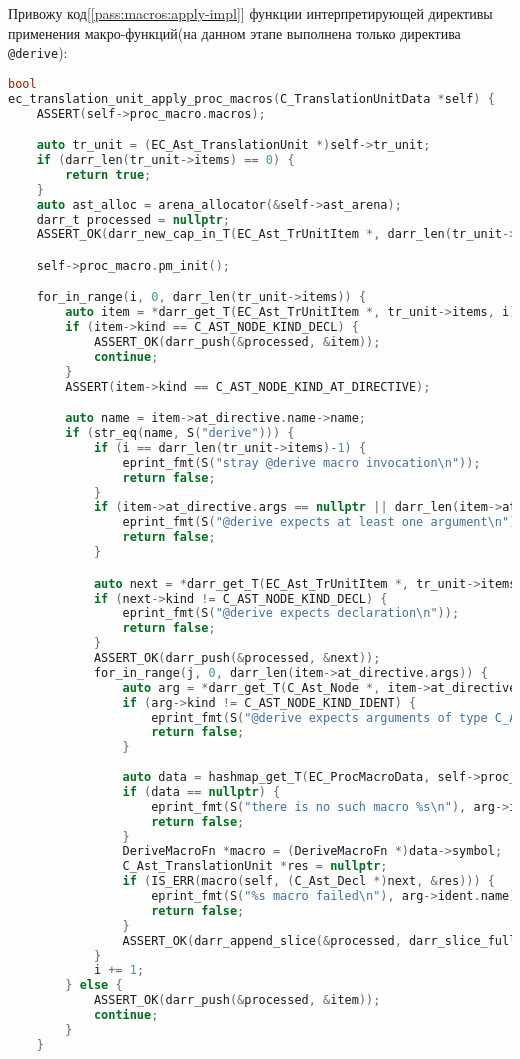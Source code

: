 Привожу код[\ref{pass:macros:apply-impl}] функции интерпретирующей директивы применения макро-функций(на данном этапе выполнена только директива \verb|@derive|):
\begin{lstlisting}[language=c, caption={Реализация функции применения макросов}, label={pass:macros:apply-impl}]
bool
ec_translation_unit_apply_proc_macros(C_TranslationUnitData *self) {
    ASSERT(self->proc_macro.macros);

    auto tr_unit = (EC_Ast_TranslationUnit *)self->tr_unit;
    if (darr_len(tr_unit->items) == 0) {
        return true;
    }
    auto ast_alloc = arena_allocator(&self->ast_arena);
    darr_t processed = nullptr;
    ASSERT_OK(darr_new_cap_in_T(EC_Ast_TrUnitItem *, darr_len(tr_unit->items), &ast_alloc, &processed));

    self->proc_macro.pm_init();

    for_in_range(i, 0, darr_len(tr_unit->items)) {
        auto item = *darr_get_T(EC_Ast_TrUnitItem *, tr_unit->items, i);
        if (item->kind == C_AST_NODE_KIND_DECL) {
            ASSERT_OK(darr_push(&processed, &item));
            continue;
        }
        ASSERT(item->kind == C_AST_NODE_KIND_AT_DIRECTIVE);

        auto name = item->at_directive.name->name;
        if (str_eq(name, S("derive"))) {
            if (i == darr_len(tr_unit->items)-1) {
                eprint_fmt(S("stray @derive macro invocation\n"));
                return false;
            }
            if (item->at_directive.args == nullptr || darr_len(item->at_directive.args) < 1) {
                eprint_fmt(S("@derive expects at least one argument\n"));
                return false;
            }

            auto next = *darr_get_T(EC_Ast_TrUnitItem *, tr_unit->items, i+1);
            if (next->kind != C_AST_NODE_KIND_DECL) {
                eprint_fmt(S("@derive expects declaration\n"));
                return false;
            }
            ASSERT_OK(darr_push(&processed, &next));
            for_in_range(j, 0, darr_len(item->at_directive.args)) {
                auto arg = *darr_get_T(C_Ast_Node *, item->at_directive.args, j);
                if (arg->kind != C_AST_NODE_KIND_IDENT) {
                    eprint_fmt(S("@derive expects arguments of type C_Ast_Ident\n"));
                    return false;
                }
                
                auto data = hashmap_get_T(EC_ProcMacroData, self->proc_macro.macros, &arg->ident.name);
                if (data == nullptr) {
                    eprint_fmt(S("there is no such macro %s\n"), arg->ident.name);
                    return false;
                }
                DeriveMacroFn *macro = (DeriveMacroFn *)data->symbol;
                C_Ast_TranslationUnit *res = nullptr;
                if (IS_ERR(macro(self, (C_Ast_Decl *)next, &res))) {
                    eprint_fmt(S("%s macro failed\n"), arg->ident.name);
                    return false;
                }
                ASSERT_OK(darr_append_slice(&processed, darr_slice_full(res->decls)));
            }
            i += 1;
        } else {
            ASSERT_OK(darr_push(&processed, &item));
            continue;
        }
    }


\end{lstlisting}
